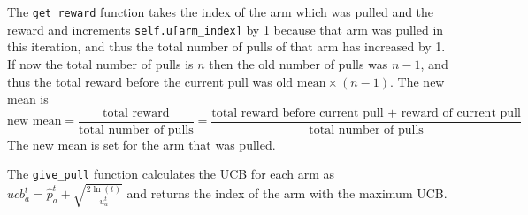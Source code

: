 \documentclass[11pt]{article}
\begin{document}
    \noindent The \texttt{get\_reward} function
    takes the index of the arm which was pulled and the reward and increments 
    \texttt{self.u[arm\_index]} by 1 because that arm was pulled in this iteration, 
    and thus the total number of pulls of that arm has increased by 1. 
    If now the total number of pulls is $n$ then the old number of pulls was
    $n-1$, and thus the total reward before the current pull was 
    $\text{old mean}\times(n-1)$. The new mean is 
    $$\text{new mean} = \frac{\text{total reward}}{\text{total number of pulls}} = \frac{\text{total reward before current pull + reward of current pull}}{\text{total number of pulls}}$$
    The new mean is set for the arm that was pulled.

   \noindent The \texttt{give\_pull} function calculates the UCB 
   for each arm as $ucb_a^t = \hat{p}_a^t + \sqrt{\frac{2 \ln(t)}{u_a^t}}$
    and returns the index of the arm with the maximum UCB.

    \vspace{3mm}
\end{document}
